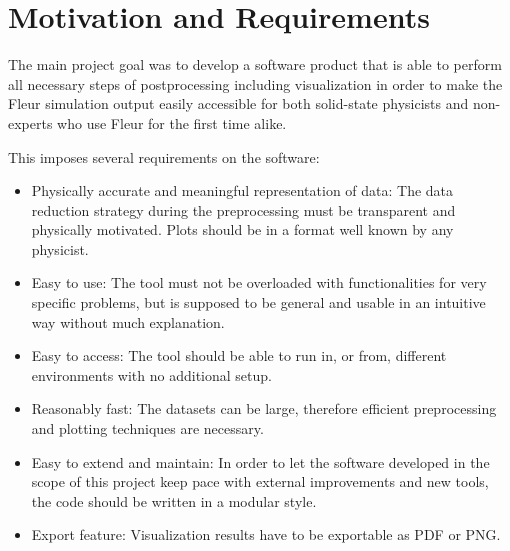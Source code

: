 

\section{Motivation and Requirements}
\label{sec:motiv-requ}

The main project goal was to develop a software product that is able to perform
all necessary steps of postprocessing including visualization in order to make
the Fleur simulation output easily accessible for both solid-state physicists
and non-experts who use Fleur for the first time alike. 

This imposes several requirements on the software:
\begin{itemize}
    \item Physically accurate and meaningful representation of data: The data reduction strategy during the preprocessing must be transparent and physically motivated. Plots should be in a format well known by any physicist.
    \item Easy to use: The tool must not be overloaded with functionalities for very specific problems, but is supposed to be general and usable in an intuitive way without much explanation.
    \item Easy to access: The tool should be able to run in, or from, different environments with no additional setup.
    \item Reasonably fast: The datasets can be large, therefore efficient preprocessing and plotting techniques are necessary.
    \item Easy to extend and maintain: In order to let the software developed in
        the scope of this project keep pace with external improvements and new
        tools, the code should be written in a modular style.
    \item Export feature: Visualization results have to be exportable as PDF or PNG.
\end{itemize}

